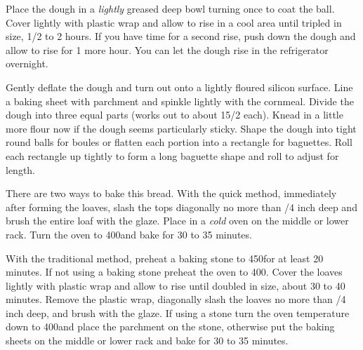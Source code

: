 \begin{IngredientsAndSteps}
{        Place the dough in a \textit{lightly} greased deep bowl turning once
        to coat the ball. Cover lightly with plastic wrap and allow to rise
        in a cool area until tripled in size, 1/2 to 2 hours. If you
        have time for a second rise, push down the dough and allow to rise
        for 1 more hour. You can let the dough rise in the refrigerator overnight.

        Gently deflate the dough and turn out onto a lightly floured silicon surface.
        Line a baking sheet with parchment and spinkle lightly with the cornmeal.
        Divide the dough into three equal parts (works out to about 15/2
        \Ounce[s] each). Knead in a little more flour now if the dough seems particularly
        sticky. Shape the dough into tight round balls for boules or flatten each
        portion into a rectangle for baguettes. Roll each rectangle up tightly to
        form a long baguette shape and roll to adjust for length.
    }
\end{IngredientsAndSteps}

\begin{IngredientsAndSteps}
    \ListIngredientsAndSteps
    {}
    {
        There are two ways to bake this bread. With the quick method, immediately after forming
        the loaves, slash the tops diagonally no more than /4 inch deep and brush
        the entire loaf with the glaze. Place in a \textit{cold} oven on the middle or lower rack.
        Turn the oven to 400\Degrees[F] and bake for 30 to 35 minutes.

        With the traditional method, preheat a baking stone to 450\Degrees[F] for at least 20 minutes.
        If not using a baking stone preheat the oven to 400\Degrees[F]. Cover the loaves lightly with
        plastic wrap and allow to rise until doubled in size, about 30 to 40 minutes. Remove the
        plastic wrap, diagonally slash the loaves no more than /4 inch deep, and brush
        with the glaze. If using a stone turn the oven temperature down to 400\Degrees[F] and place
        the parchment on the stone, otherwise put the baking sheets on the middle or lower rack and
        bake for 30 to 35 minutes.
    }
\end{IngredientsAndSteps}

%
%
%
%

\newpage



